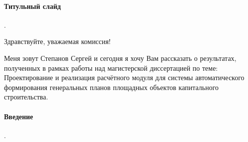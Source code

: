 \documentclass[11pt]{article}
\begin{document}
\paragraph{Титульный слайд}.

Здравствуйте, уважаемая комиссия!

Меня зовут Степанов Сергей и сегодня я хочу Вам рассказать о результатах,
полученных в рамках работы над магистерской диссертацией по теме:
Проектирование и реализация расчётного модуля для системы автоматического формирования
генеральных планов площадных объектов капитального строительства.


\paragraph{Введение}.
\end{document}

